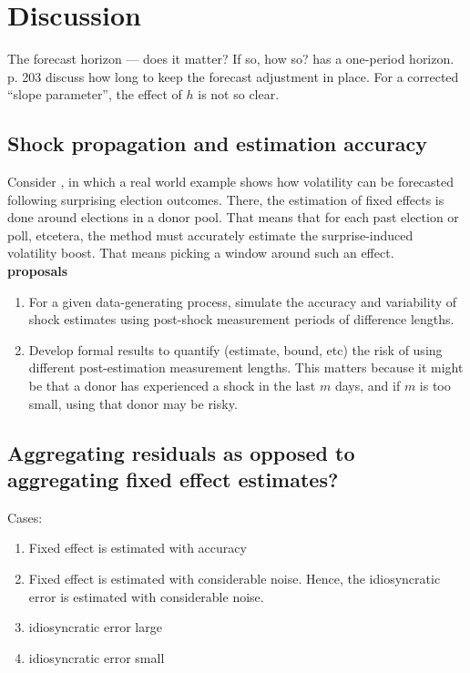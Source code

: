 \documentclass[11pt]{article}
\theoremstyle{definition}
\begin{document}
\section{Discussion}

The forecast horizon --- does it matter?  If so, how so?  \cite{lin2021minimizing} has a one-period horizon.  \cite{clements1998forecasting}{p. 203} discuss how long to keep the forecast adjustment in place.  For a corrected ``slope parameter'', the effect of $h$ is not so clear.\\

\subsection{Shock propagation and estimation accuracy}
Consider \cite{lundquist2024volatility}, in which a real world example shows how volatility can be forecasted following surprising election outcomes.  There, the estimation of fixed effects is done around elections in a donor pool.  That means that for each past election or poll, etcetera, the method must accurately estimate the surprise-induced volatility boost.  That means picking a window around such an effect.\\

\textbf{proposals}
\begin{enumerate}
  \item For a given data-generating process, simulate the accuracy and variability of shock estimates using post-shock measurement periods of difference lengths.
  \item Develop formal results to quantify (estimate, bound, etc) the risk of using different post-estimation measurement lengths.  This matters because it might be that a donor has experienced a shock in the last $m$ days, and if $m$ is too small, using that donor may be risky.
\end{enumerate}
    

\subsection{Aggregating residuals as opposed to aggregating fixed effect estimates?}

Cases:
\begin{enumerate}
  \item Fixed effect is estimated with accuracy 
  \item Fixed effect is estimated with considerable noise.  Hence, the idiosyncratic error is estimated with considerable noise.
  \item idiosyncratic error large
  \item idiosyncratic error small
\end{enumerate}  
\end{document}

